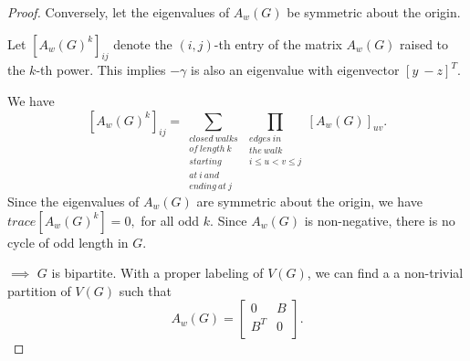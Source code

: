 \documentclass[10pt,a4paper]{amsart}
\begin{document}
\begin{proof}
    Conversely, let the eigenvalues of $A_w(G)$ be symmetric about the origin.
	
	Let \([A_{w}(G )^{k}]_{ij}\) denote the \((i,j)\)-th entry of the matrix \(A_{w}(G )\) raised to the \(k\)-th power.
	This implies $-\gamma $ is also an eigenvalue with eigenvector $[y\ -z]^{T}.$
	
	
	
	We have
	$$[A_{w}(G )^{k}]_{ij}=\sum\limits_{\substack{closed \ walks \\ of \ length\  k\\  starting\\  at\  i\  and \\ ending\ at\  j}}\prod\limits_{\substack{edges\ in \\ the \ walk\\ i\leq u<v\leq j}}[A_{w}(G )]_{uv}.$$
Since the eigenvalues of $A_w(G)$ are symmetric about the origin, we have
$trace[A_{w}(G)^k]=0,$ for all odd $k.$ 
Since $A_w(G)$ is non-negative, there is no cycle of odd length in $G.$ 

$\implies$ $G$ is bipartite. With a proper labeling of $V(G)$, we can find a a non-trivial partition of $V(G)$ such that $$A_w(G)=\begin{bmatrix}
0 & B\\
B^T & 0\\
\end{bmatrix}.$$ 
\end{proof}
\end{document}
